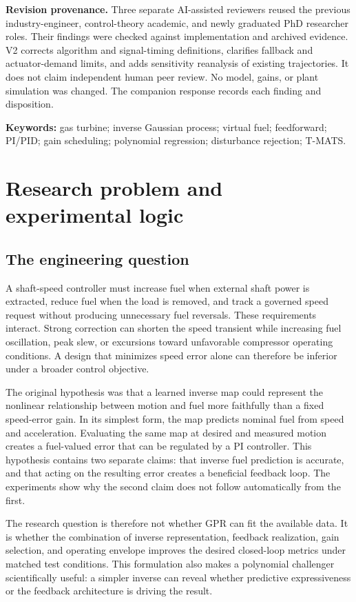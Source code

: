 \documentclass[11pt,a4paper,oneside]{report}
\begin{document}
\textbf{Revision provenance.} Three separate AI-assisted reviewers reused the previous industry-engineer, control-theory academic, and newly graduated PhD researcher roles. Their findings were checked against implementation and archived evidence. V2 corrects algorithm and signal-timing definitions, clarifies fallback and actuator-demand limits, and adds sensitivity reanalysis of existing trajectories. It does not claim independent human peer review. No model, gains, or plant simulation was changed. The companion response records each finding and disposition.

\textbf{Keywords:} gas turbine; inverse Gaussian process; virtual fuel; feedforward; PI/PID; gain scheduling; polynomial regression; disturbance rejection; T-MATS.
\tableofcontents
\clearpage\listoffigures
\clearpage\listoftables
\clearpage{}

\chapter{Research problem and experimental logic}
\section{The engineering question}
A shaft-speed controller must increase fuel when external shaft power is extracted, reduce fuel when the load is removed, and track a governed speed request without producing unnecessary fuel reversals. These requirements interact. Strong correction can shorten the speed transient while increasing fuel oscillation, peak slew, or excursions toward unfavorable compressor operating conditions. A design that minimizes speed error alone can therefore be inferior under a broader control objective.

The original hypothesis was that a learned inverse map could represent the nonlinear relationship between motion and fuel more faithfully than a fixed speed-error gain. In its simplest form, the map predicts nominal fuel from speed and acceleration. Evaluating the same map at desired and measured motion creates a fuel-valued error that can be regulated by a PI controller. This hypothesis contains two separate claims: that inverse fuel prediction is accurate, and that acting on the resulting error creates a beneficial feedback loop. The experiments show why the second claim does not follow automatically from the first.

The research question is therefore not whether GPR can fit the available data. It is whether the combination of inverse representation, feedback realization, gain selection, and operating envelope improves the desired closed-loop metrics under matched test conditions. This formulation also makes a polynomial challenger scientifically useful: a simpler inverse can reveal whether predictive expressiveness or the feedback architecture is driving the result.
\end{document}
